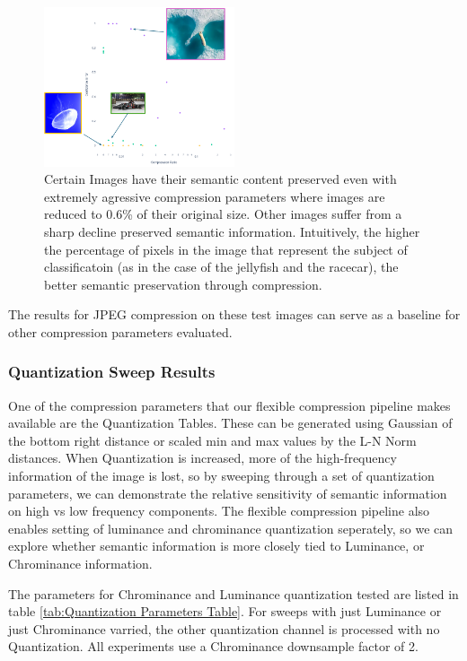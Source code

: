\begin{figure}
    \label{fig:Annotated JPEG Baseline}
    \includegraphics[width=0.5\textwidth]{assets/JPEG Baseline Compression with Examples}
    \caption{Certain Images have their semantic content preserved even with extremely agressive compression parameters where images are reduced to 0.6\% of their original size. Other images suffer from a sharp decline preserved semantic information. Intuitively, the higher the percentage of pixels in the image that represent the subject of classificatoin (as in the case of the jellyfish and the racecar), the better semantic preservation through compression.}
\end{figure}

The results for JPEG compression on these test images can serve as a baseline for other compression parameters evaluated.

\subsubsection{Quantization Sweep Results}

One of the compression parameters that our flexible compression pipeline makes available are the Quantization Tables.
These can be generated using Gaussian of the bottom right distance or scaled min and max values by the L-N Norm distances.
When Quantization is increased, more of the high-frequency information of the image is lost, so by sweeping through a set of quantization parameters, we can demonstrate the relative sensitivity of semantic information on high vs low frequency components.
The flexible compression pipeline also enables setting of luminance and chrominance quantization seperately, so we can explore whether semantic information is more closely tied to Luminance, or Chrominance information.

The parameters for Chrominance and Luminance quantization tested are listed in table \ref{tab:Quantization Parameters Table}. For sweeps with just Luminance or just Chrominance varried, the other quantization channel is processed with no Quantization.
All experiments use a Chrominance downsample factor of 2.

